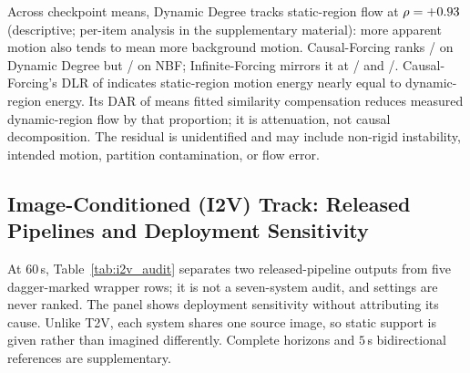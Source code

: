 Across \SNFnPublicTTV{} checkpoint means, Dynamic Degree tracks static-region flow at $\rho=+0.93$ (descriptive; per-item analysis in the supplementary material): more apparent motion also tends to mean more background motion. Causal-Forcing ranks \SNFrankCFDD{}/\SNFnPublicTTV{} on Dynamic Degree but \SNFrankCFNBF{}/\SNFnPublicTTV{} on NBF; Infinite-Forcing mirrors it at \SNFrankIFNBF{}/\SNFnPublicTTV{} and \SNFrankIFDD{}/\SNFnPublicTTV{}. Causal-Forcing's DLR of \SNFvalCFDLR{} indicates static-region motion energy nearly equal to dynamic-region energy. Its DAR of \SNFvalCFDAR{} means fitted similarity compensation reduces measured dynamic-region flow by that proportion; it is attenuation, not causal decomposition. The residual is unidentified and may include non-rigid instability, intended motion, partition contamination, or flow error.


\subsection{Image-Conditioned (I2V) Track: Released Pipelines and Deployment Sensitivity}
\label{sec:results_i2v}

At $60$\,s, Table~\ref{tab:i2v_audit} separates two released-pipeline outputs from five dagger-marked wrapper rows; it is not a seven-system audit, and settings are never ranked. The panel shows deployment sensitivity without attributing its cause. Unlike T2V, each system shares one source image, so static support is given rather than imagined differently. Complete horizons and $5$\,s bidirectional references are supplementary.
